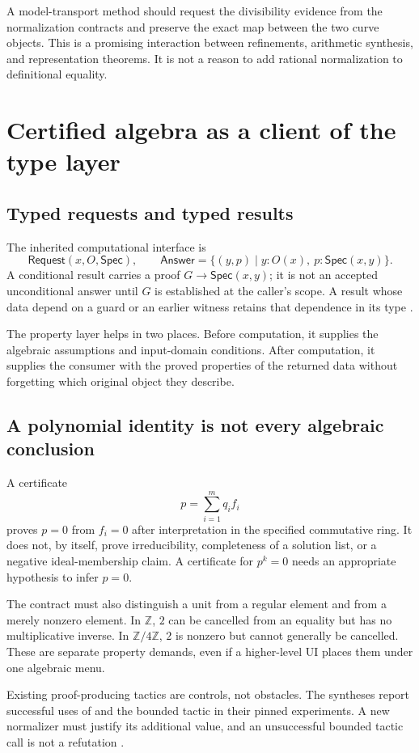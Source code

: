 \documentclass[11pt,a4paper]{article}
\newcommand{\code}[1]{\texttt{\detokenize{#1}}}
\newcommand{\Z}{\mathbb Z}
\newcommand{\Spec}{\mathsf{Spec}}
\theoremstyle{definition}
\begin{document}
A model-transport method should request the divisibility evidence from the
normalization contracts and preserve the exact map between the two curve
objects. This is a promising interaction between refinements, arithmetic
synthesis, and representation theorems. It is not a reason to add rational
normalization to definitional equality.

\section{Certified algebra as a client of the type layer}\label{sec:cas}
\subsection{Typed requests and typed results}
The inherited computational interface is
\[
 \mathsf{Request}(x,O,\Spec),\qquad
 \mathsf{Answer}=\{(y,p)\mid y:O(x),\ p:\Spec(x,y)\}.
\]
A conditional result carries a proof $G\to\Spec(x,y)$; it is not an accepted
unconditional answer until $G$ is established at the caller's scope. A result
whose data depend on a guard or an earlier witness retains that dependence in
its type \cite{round2a,round2b}.

The property layer helps in two places. Before computation, it supplies the
algebraic assumptions and input-domain conditions. After computation, it
supplies the consumer with the proved properties of the returned data without
forgetting which original object they describe.

\subsection{A polynomial identity is not every algebraic conclusion}
A certificate
\[
 p=\sum_{i=1}^{m}q_if_i
\]
proves $p=0$ from $f_i=0$ after interpretation in the specified commutative ring.
It does not, by itself, prove irreducibility, completeness of a solution list,
or a negative ideal-membership claim. A certificate for $p^k=0$ needs an
appropriate hypothesis to infer $p=0$.

The contract must also distinguish a unit from a regular element and from a
merely nonzero element. In $\Z$, $2$ can be cancelled from an equality but has
no multiplicative inverse. In $\Z/4\Z$, $2$ is nonzero but cannot generally be
cancelled. These are separate property demands, even if a higher-level UI
places them under one algebraic menu.

Existing proof-producing tactics are controls, not obstacles. The syntheses
report successful uses of \code{linear_combination} and the bounded
\code{grobner} tactic in their pinned experiments. A new normalizer must justify
its additional value, and an unsuccessful bounded tactic call is not a
refutation \cite{round2a,round2b}.
\end{document}
